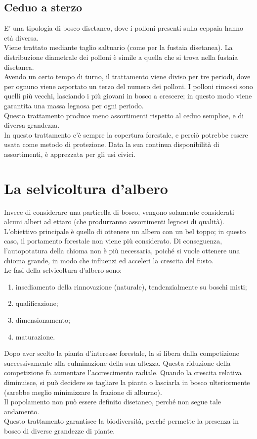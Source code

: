\documentclass{article}
\begin{document}
\subsection{Ceduo a sterzo}
E' una tipologia di bosco disetaneo, dove i polloni presenti sulla ceppaia hanno età diversa.\\
Viene trattato mediante taglio saltuario (come per la fustaia disetanea). La distribuzione diametrale dei polloni è simile a quella che si trova nella fustaia disetanea.\\
Avendo un certo tempo di turno, il trattamento viene diviso per tre periodi, dove per ognuno viene asportato un terzo del numero dei polloni. I polloni rimossi sono quelli più vecchi, lasciando i più giovani in bosco a crescere; in questo modo viene garantita una massa legnosa per ogni periodo.\\
Questo trattamento produce meno assortimenti rispetto al ceduo semplice, e di diversa grandezza.\\
In questo trattamento c'è sempre la copertura forestale, e perciò potrebbe essere usata come metodo di protezione. Data la sua continua disponibilità di assortimenti, è apprezzata per gli usi civici.
\section{La selvicoltura d'albero}
Invece di considerare una particella di bosco, vengono solamente considerati alcuni alberi ad ettaro (che produrranno assortimenti legnosi di qualità).\\
L'obiettivo principale è quello di ottenere un albero con un bel toppo; in questo caso, il portamento forestale non viene più considerato. Di conseguenza, l'autopotatura della chioma non è più necessaria, poiché si vuole ottenere una chioma grande, in modo che influenzi ed acceleri la crescita del fusto.\\
Le fasi della selvicoltura d'albero sono:
\begin{enumerate}
    \item insediamento della rinnovazione (naturale), tendenzialmente su boschi misti;
    \item qualificazione;
    \item dimensionamento;
    \item maturazione.
\end{enumerate}
Dopo aver scelto la pianta d'interesse forestale, la si libera dalla competizione successivamente alla culminazione della sua altezza. Questa riduzione della competizione fa aumentare l'accrescimento radiale. Quando la crescita relativa diminuisce, si può decidere se tagliare la pianta o lasciarla in bosco ulteriormente (sarebbe meglio minimizzare la frazione di alburno).\\
Il popolamento non può essere definito disetaneo, perché non segue tale andamento.\\
Questo trattamento garantisce la biodiversità, perché permette la presenza in bosco di diverse grandezze di piante.\\
\end{document}
